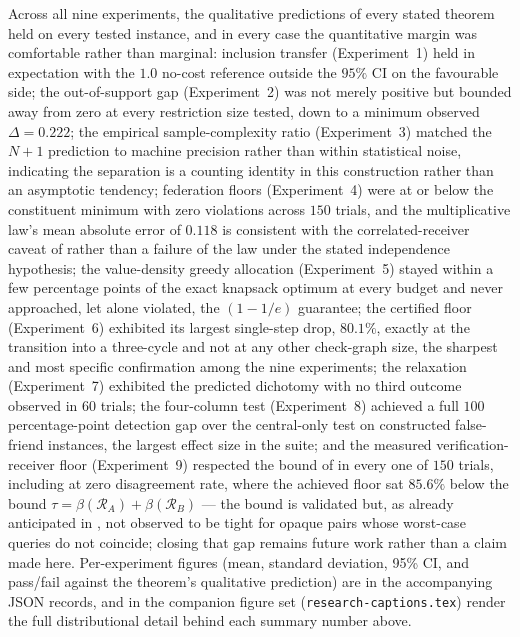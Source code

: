 \documentclass[11pt,twocolumn,a4paper]{article}
\theoremstyle{rdm}
\theoremstyle{definition}
\theoremstyle{remark}
\newcommand{\flo}{\beta}
\newcommand{\Rec}{\mathcal{R}}
\begin{document}
Across all nine experiments, the qualitative predictions of every stated
theorem held on every tested instance, and in every case the quantitative
margin was comfortable rather than marginal: inclusion transfer
(Experiment~1) held in expectation with the $1.0$ no-cost reference outside
the $95\%$ CI on the favourable side; the out-of-support gap (Experiment~2)
was not merely positive but bounded away from zero at every restriction size
tested, down to a minimum observed $\Delta=0.222$; the empirical
sample-complexity ratio (Experiment~3) matched the $N+1$ prediction to
machine precision rather than within statistical noise, indicating the
separation is a counting identity in this construction rather than an
asymptotic tendency; federation floors (Experiment~4) were at or below the
constituent minimum with zero violations across $150$ trials, and the
multiplicative law's mean absolute error of $0.118$ is consistent with the
correlated-receiver caveat of  rather than a failure of
the law under the stated independence hypothesis; the value-density greedy
allocation (Experiment~5) stayed within a few percentage points of the exact
knapsack optimum at every budget and never approached, let alone violated,
the $(1-1/e)$ guarantee; the certified floor (Experiment~6) exhibited its
largest single-step drop, $80.1\%$, exactly at the transition into a
three-cycle and not at any other check-graph size, the sharpest and most
specific confirmation among the nine experiments; the relaxation
(Experiment~7) exhibited the predicted dichotomy with no third outcome
observed in $60$ trials; the four-column test (Experiment~8) achieved a full
$100$ percentage-point detection gap over the central-only test on
constructed false-friend instances, the largest effect size in the suite;
and the measured verification-receiver floor (Experiment~9) respected the
bound of  in every one of $150$ trials, including at
zero disagreement rate, where the achieved floor sat $85.6\%$ below the
bound $\tau=\flo(\Rec_A)+\flo(\Rec_B)$ --- the bound is validated but, as
already anticipated in , not observed to be tight for
opaque pairs whose worst-case queries do not coincide; closing that gap
remains future work rather than a claim made here. Per-experiment figures
(mean, standard deviation, 95\% CI, and pass/fail against the theorem's
qualitative prediction) are in the accompanying JSON records, and
in the companion figure set (\texttt{research-captions.tex}) render the full
distributional detail behind each summary number above.
\end{document}
